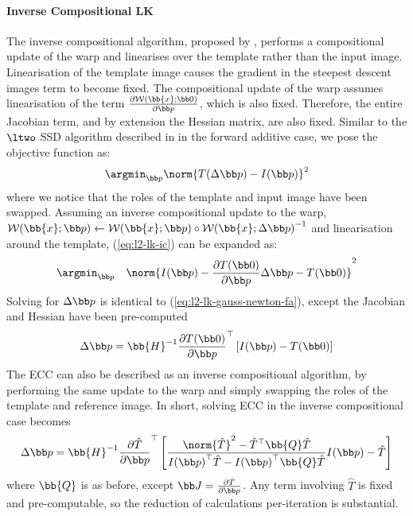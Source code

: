 \paragraph{Inverse Compositional LK}\label{subsubsec:lk-ic}
The inverse compositional algorithm, proposed by \citet{baker2004lucas},
performs a compositional update of the warp and
linearises over the template rather than the input image. Linearisation of the
template image causes the gradient in the steepest descent images term to become
fixed. The compositional update of the warp assumes linearisation of the term
$\frac{\partial \mathcal{W}(\bb{x};\zero)}{\partial \p}$, which is also
fixed. Therefore, the entire Jacobian term, and by extension the Hessian matrix,
are also fixed. Similar to the $\ltwo$ SSD algorithm described in
in the forward additive case, we pose the objective function as:
\begin{equation}\label{eq:l2-lk-ic}
    \argmin_{\p} \norm{T(\Delta \p) - I(\p)}^2
\end{equation}
where we notice that the roles of the template and input image have been
swapped. Assuming an inverse compositional update to the warp,
$\mathcal{W}(\bb{x};\p) \leftarrow \mathcal{W}(\bb{x};\p) \circ {\mathcal{W}(\bb{x};\Delta \p)}^{-1}$
and linearisation around the template, (\ref{eq:l2-lk-ic}) can be expanded as:
\begin{equation}\label{eq:l2-lk-linearised-ic}
    \argmin_{\p} \quad \norm{I(\p) - \frac{\partial T(\zero)}{\partial \p} \Delta \p - T(\zero)}^2
\end{equation}
Solving for $\Delta \p$ is identical to (\ref{eq:l2-lk-gauss-newton-fa}), except
the Jacobian and Hessian have been pre-computed
\begin{equation}\label{eq:l2-lk-gauss-newton-ic}
    \Delta \p = \bb{H}^{-1} \frac{\partial T(\zero)}{\partial \p}^{\top} \left[ I(\p) - T(\zero) \right]
\end{equation}
The ECC can also be described as an inverse compositional algorithm, by
performing the same update to the warp and simply swapping the roles of the
template and reference image. In short, solving ECC in the inverse compositional
case becomes
\begin{equation}\label{eq:ecc-lk-gauss-newton-ic}
    \Delta \p = \bb{H}^{-1} \frac{\partial \hat{T}}{\partial \p}^{\top} \left[ \frac{\norm{\hat{T}}^2 - \hat{T}^{\top} \bb{Q} \hat{T}}{{I(\p)}^{\top} \hat{T} - {I(\p)}^{\top} \bb{Q} \hat{T}} I(\p) - \hat{T} \right]
\end{equation}
where $\bb{Q}$ is as before, except $\J = \frac{\partial \hat{T}}{\partial \p}$.
Any term involving $\hat{T}$ is fixed and pre-computable, so the reduction of
calculations per-iteration is substantial.


